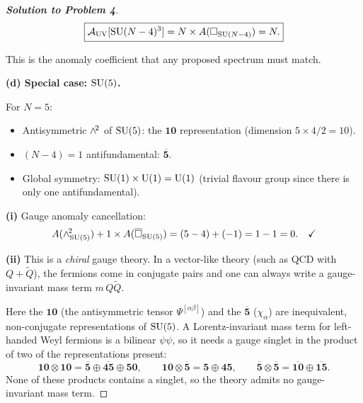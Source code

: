 \documentclass[11pt,a4paper]{article}
\begin{document}
\begin{proof}[\textbf{Solution to Problem 4}]
\begin{equation}
  \boxed{%
  \mathcal{A}_{\UV}[\SU{N-4}^3] = N \times A(\fund_{\SU{N-4}}) = N.
  }
\end{equation}

This is the anomaly coefficient that any proposed \IR{} spectrum must
match.

\textbf{(d) Special case: $\mathrm{SU}(5)$.}

For $N = 5$:
\begin{itemize}
  \item Antisymmetric $\wedge^{\!2}$ of $\mathrm{SU}(5)$: the $\mathbf{10}$
    representation (dimension $5 \times 4 / 2 = 10$).
  \item $(N-4) = 1$ antifundamental: $\overline{\mathbf{5}}$.
  \item Global symmetry: $\mathrm{SU}(1) \times \mathrm{U}(1) = \mathrm{U}(1)$ (trivial
    flavour group since there is only one antifundamental).
\end{itemize}

\textbf{(i)} Gauge anomaly cancellation:
\begin{equation}
  A(\wedge^{\!2}_{\mathrm{SU}(5)}) + 1 \times A(\overline{\square}_{\mathrm{SU}(5)})
  = (5-4) + (-1) = 1 - 1 = 0. \quad\checkmark
\end{equation}

\textbf{(ii)} This is a \emph{chiral} gauge theory.  In a vector-like
theory (such as QCD with $Q + \widetilde{Q}$), the fermions come in
conjugate pairs and one can always write a gauge-invariant mass term
$m\,Q\widetilde{Q}$.

Here the $\mathbf{10}$ (the antisymmetric tensor $\Psi^{[\alpha\beta]}$)
and the $\overline{\mathbf{5}}$ ($\chi_\alpha$) are inequivalent,
non-conjugate representations of $\mathrm{SU}(5)$.  A Lorentz-invariant mass
term for left-handed Weyl fermions is a bilinear $\psi\psi$, so it needs
a gauge singlet in the product of two of the representations present:
\begin{equation}
  \mathbf{10} \otimes \mathbf{10}
  = \overline{\mathbf{5}} \oplus \overline{\mathbf{45}} \oplus \mathbf{50},
  \qquad
  \mathbf{10} \otimes \overline{\mathbf{5}} = \mathbf{5} \oplus \mathbf{45},
  \qquad
  \overline{\mathbf{5}} \otimes \overline{\mathbf{5}}
  = \overline{\mathbf{10}} \oplus \overline{\mathbf{15}}.
\end{equation}
None of these products contains a singlet, so the theory admits no
gauge-invariant mass term.


\end{proof}
\end{document}
